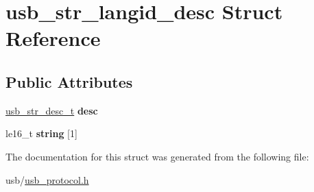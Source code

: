 \hypertarget{structusb__str__langid__desc}{}\section{usb\+\_\+str\+\_\+langid\+\_\+desc Struct Reference}
\label{structusb__str__langid__desc}
\subsection*{Public Attributes}
\begin{DoxyCompactItemize}
\item 
\mbox{\label{structusb__str__langid__desc_a943ce0859c31dc20803c60708e3cf151}} 
\hyperlink{group__usb__protocol__group_ga71edff7a33abb868e08e9243e7ea7c45}{usb\+\_\+str\+\_\+desc\+\_\+t} {\bfseries desc}
\item 
\mbox{\label{structusb__str__langid__desc_a7262c39e846918f8da993913e879cbae}} 
le16\+\_\+t {\bfseries string} \mbox{[}1\mbox{]}
\end{DoxyCompactItemize}


The documentation for this struct was generated from the following file\+:\begin{DoxyCompactItemize}
\item 
usb/\hyperlink{usb__protocol_8h}{usb\+\_\+protocol.\+h}\end{DoxyCompactItemize}
